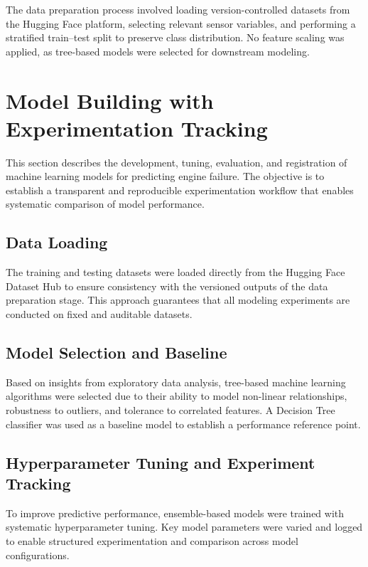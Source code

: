 \documentclass[11pt,a4paper]{article}
\begin{document}
The data preparation process involved loading version-controlled datasets from the Hugging Face platform, selecting relevant sensor variables, and performing a stratified train--test split to preserve class distribution. No feature scaling was applied, as tree-based models were selected for downstream modeling.


\newpage


\section{Model Building with Experimentation Tracking}

This section describes the development, tuning, evaluation, and registration of machine learning models for predicting engine failure. The objective is to establish a transparent and reproducible experimentation workflow that enables systematic comparison of model performance.

\subsection{Data Loading}

The training and testing datasets were loaded directly from the Hugging Face Dataset Hub to ensure consistency with the versioned outputs of the data preparation stage. This approach guarantees that all modeling experiments are conducted on fixed and auditable datasets.

\subsection{Model Selection and Baseline}

Based on insights from exploratory data analysis, tree-based machine learning algorithms were selected due to their ability to model non-linear relationships, robustness to outliers, and tolerance to correlated features. A Decision Tree classifier was used as a baseline model to establish a performance reference point.

\subsection{Hyperparameter Tuning and Experiment Tracking}

To improve predictive performance, ensemble-based models were trained with systematic hyperparameter tuning. Key model parameters were varied and logged to enable structured experimentation and comparison across model configurations.
\end{document}
